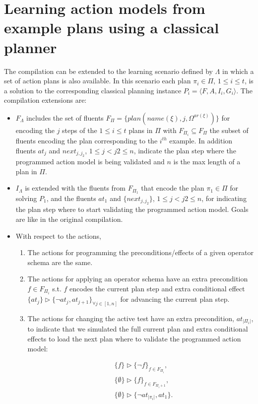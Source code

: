 \documentclass[letterpaper]{article} %
\newcommand{\tup}[1]{{\langle #1 \rangle}}
\begin{document}
\section{Learning action models from example plans using a classical planner}
The compilation can be extended to the learning scenario defined by $\Lambda$ in which a set of action plans is also available. In this scenario each plan $\pi_i\in \Pi$, {\small $1\leq i\leq t$}, is a solution to the corresponding classical planning instance $P_i=\tup{F,A,I_i,G_i}$. The compilation extensions are: 
\begin{itemize}
\item $F_{\Lambda}$ includes the set of fluents $F_{\Pi}=\{plan(name(\xi),j,\Omega^{ar(\xi)})\}$ for encoding the $j$ steps of the {\small $1\leq i\leq t$} plans in $\Pi$ with $F_{\Pi_i}\subseteq F_{\Pi}$ the subset of fluents encoding the plan corresponding to the $i^{th}$ example. In addition fluents $at_j$ and $next_{j,j_2}$, {\small $1\leq j<j2\leq n$}, indicate the plan step where the programmed action model is being validated and $n$ is the max length of a plan in $\Pi$.
\item $I_{\Lambda}$ is extended with the fluents from $F_{\Pi_1}$ that encode the plan $\pi_1\in \Pi$ for solving $P_1$, and the fluents $at_1$ and $\{next_{j,j_2}\}$, {\small $1\leq j<j2\leq n$}, for indicating the plan step where to start validating the programmed action model. Goals are like in the original compilation.
\item With respect to the actions,
\begin{enumerate}
\item The actions for programming the preconditions/effects of a given operator schema are the same.
\item The actions for applying an operator schema have an extra precondition $f\in F_{\Pi_i}$ s.t. $f$ encodes the current plan step and extra conditional effect $\{at_{j}\}\rhd\{\neg at_{j},at_{j+1}\}_{\forall j\in [1,n]}$ for advancing the current plan step.
\item The actions for changing the active test have an extra precondition, $at_{|\Pi_i|}$, to indicate that we simulated the full current plan and extra conditional effects to load the next plan where to validate the programmed action model:
\begin{small}
\begin{align*}
&\{f\}\rhd\{\neg f\}_{f\in F_{\Pi_i}},\\
&\{\emptyset\}\rhd\{f\}_{f\in F_{\Pi_i+1}},\\
&\{\emptyset\}\rhd\{\neg at_{|\pi_i|},at_1\}.
\end{align*}
\end{small}
\end{enumerate}
\end{itemize}
\end{document}
